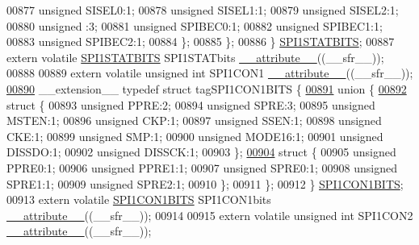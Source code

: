 \begin{DoxyCode}
00877       \textcolor{keywordtype}{unsigned} SISEL0:1;
00878       \textcolor{keywordtype}{unsigned} SISEL1:1;
00879       \textcolor{keywordtype}{unsigned} SISEL2:1;
00880       \textcolor{keywordtype}{unsigned} :3;
00881       \textcolor{keywordtype}{unsigned} SPIBEC0:1;
00882       \textcolor{keywordtype}{unsigned} SPIBEC1:1;
00883       \textcolor{keywordtype}{unsigned} SPIBEC2:1;
00884     \};
00885   \};
00886 \} \hyperlink{a00008_df/d5f/a00762}{SPI1STATBITS};
00887 \textcolor{keyword}{extern} \textcolor{keyword}{volatile} \hyperlink{a00008_df/d5f/a00762}{SPI1STATBITS} SPI1STATbits \hyperlink{a00009_a493c46f03454991ccc5aa7a6e1dfb2a7}{\_\_attribute\_\_}((\_\_sfr\_\_));
00888 
00889 \textcolor{keyword}{extern} \textcolor{keyword}{volatile} \textcolor{keywordtype}{unsigned} \textcolor{keywordtype}{int}  SPI1CON1 \hyperlink{a00009_a493c46f03454991ccc5aa7a6e1dfb2a7}{\_\_attribute\_\_}((\_\_sfr\_\_));
\hypertarget{a00009_source_l00890}{}\hyperlink{a00008}{00890} \_\_extension\_\_ \textcolor{keyword}{typedef} \textcolor{keyword}{struct }tagSPI1CON1BITS \{
\hypertarget{a00009_source_l00891}{}\hyperlink{a00009}{00891}   \textcolor{keyword}{union }\{
\hypertarget{a00009_source_l00892}{}\hyperlink{a00009}{00892}     \textcolor{keyword}{struct }\{
00893       \textcolor{keywordtype}{unsigned} PPRE:2;
00894       \textcolor{keywordtype}{unsigned} SPRE:3;
00895       \textcolor{keywordtype}{unsigned} MSTEN:1;
00896       \textcolor{keywordtype}{unsigned} CKP:1;
00897       \textcolor{keywordtype}{unsigned} SSEN:1;
00898       \textcolor{keywordtype}{unsigned} CKE:1;
00899       \textcolor{keywordtype}{unsigned} SMP:1;
00900       \textcolor{keywordtype}{unsigned} MODE16:1;
00901       \textcolor{keywordtype}{unsigned} DISSDO:1;
00902       \textcolor{keywordtype}{unsigned} DISSCK:1;
00903     \};
\hypertarget{a00009_source_l00904}{}\hyperlink{a00009}{00904}     \textcolor{keyword}{struct }\{
00905       \textcolor{keywordtype}{unsigned} PPRE0:1;
00906       \textcolor{keywordtype}{unsigned} PPRE1:1;
00907       \textcolor{keywordtype}{unsigned} SPRE0:1;
00908       \textcolor{keywordtype}{unsigned} SPRE1:1;
00909       \textcolor{keywordtype}{unsigned} SPRE2:1;
00910     \};
00911   \};
00912 \} \hyperlink{a00008_d2/d4a/a00758}{SPI1CON1BITS};
00913 \textcolor{keyword}{extern} \textcolor{keyword}{volatile} \hyperlink{a00008_d2/d4a/a00758}{SPI1CON1BITS} SPI1CON1bits \hyperlink{a00009_a493c46f03454991ccc5aa7a6e1dfb2a7}{\_\_attribute\_\_}((\_\_sfr\_\_));
00914 
00915 \textcolor{keyword}{extern} \textcolor{keyword}{volatile} \textcolor{keywordtype}{unsigned} \textcolor{keywordtype}{int}  SPI1CON2 \hyperlink{a00009_a493c46f03454991ccc5aa7a6e1dfb2a7}{\_\_attribute\_\_}((\_\_sfr\_\_));

\end{DoxyCode}
